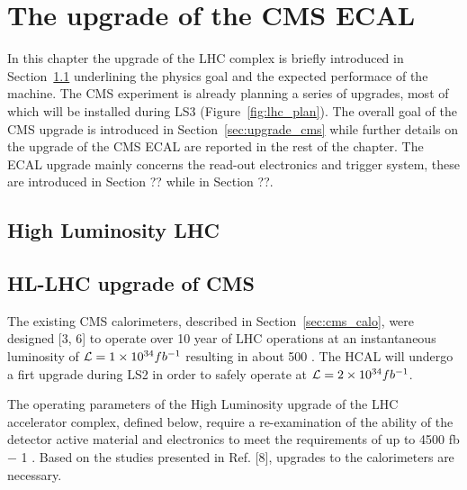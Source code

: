 \chapter{The upgrade of the CMS ECAL}
\label{chapter:ecal_upgrade}

In this chapter the upgrade of the LHC complex is briefly introduced in Section~\ref{upgrade_lhc}
underlining the physics goal and the expected performace of the machine. The CMS experiment is already planning
a series of upgrades, most of which will be installed during LS3 (Figure~\ref{fig:lhc_plan}).
The overall goal of the CMS upgrade is introduced in Section~\ref{sec:upgrade_cms} while
further details on the upgrade of the CMS ECAL are reported in the rest of the chapter.
The ECAL upgrade mainly concerns the read-out electronics and trigger system, these are introduced in Section ??
while in Section ??.

\section{High Luminosity LHC}
\label{upgrade_lhc}

\section{HL-LHC upgrade of CMS}
\label{upgrade_cms}
The existing CMS calorimeters, described in Section~\ref{sec:cms_calo},
were designed [3, 6] to operate over 10 year of LHC operations at an instantaneous luminosity
of $\mathcal{L} = 1\times10^{34}fb^{-1}$ resulting in about 500 \fbinv. The HCAL will undergo a firt upgrade
during LS2 in order to safely operate at $\mathcal{L} = 2\times10^{34}fb^{-1}$.

The operating parameters of the High Luminosity
upgrade of the LHC accelerator complex, defined below, require a re-examination of the ability
of the detector active material and electronics to meet the requirements of up to 4500 fb − 1 .
Based on the studies presented in Ref. [8], upgrades to the calorimeters are necessary.